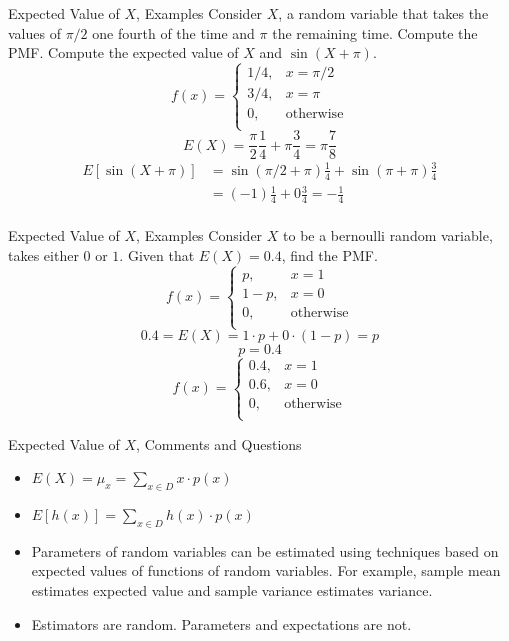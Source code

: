 \documentclass[]{beamer}
\begin{document}
\begin{frame}{Expected Value of $X$, Examples}
    Consider $X$, a random variable that takes the values of $\pi/2$ one fourth of the time and $\pi$ the remaining time. Compute the PMF. Compute the expected value of $X$ and $\sin(X+ \pi)$.
    \pause
    $$f(x)= \left\{\begin{array}{lr}
        1/4, & x = \pi/2\\
        3/4, & x= \pi\\
        0, & \text{otherwise}\\
        \end{array}\right.$$
        \pause
        $$ E(X) = \frac{\pi}{2} \frac{1}{4} + \pi \frac{3}{4} = \pi \frac{7}{8} $$
        \pause
        \begin{align*}
            E[\sin(X+\pi)] & = \sin( \pi/2+ \pi) \frac{1}{4} + \sin( \pi+ \pi)\frac{3}{4}\\ 
            & = (-1)\frac{1}{4} + 0\frac{3}{4} = -\frac{1}{4}\\
        \end{align*}
\end{frame}

\begin{frame}{Expected Value of $X$, Examples}
    Consider $X$ to be a bernoulli random variable, takes either $0$ or $1$. Given that $E(X) = 0.4$, find the PMF.
    \pause
    $$f(x)= \left\{\begin{array}{lr}
        p, & x = 1\\
        1-p, & x= 0\\
        0, & \text{otherwise}\\
        \end{array}\right.$$
        \pause
    $$ 0.4 = E(X) = 1\cdot p + 0 \cdot (1-p) = p $$
    $$ p = 0.4$$
    $$f(x)= \left\{\begin{array}{lr}
        0.4, & x = 1\\
        0.6, & x= 0\\
        0, & \text{otherwise}\\
        \end{array}\right.$$
\end{frame}

\begin{frame}{Expected Value of $X$, Comments and Questions}
    \begin{itemize}
        \item $E(X) = \mu_x = \sum_{x \in D} x \cdot p(x) $
        \item $E[h(x)] = \sum_{x \in D} h(x) \cdot p(x) $
        \item Parameters of random variables can be estimated using techniques based on expected values of functions of random variables. For example, sample mean estimates expected value and sample variance estimates variance.
        \item Estimators are random. Parameters and expectations are not.
    \end{itemize}
\end{frame}
\end{document}
